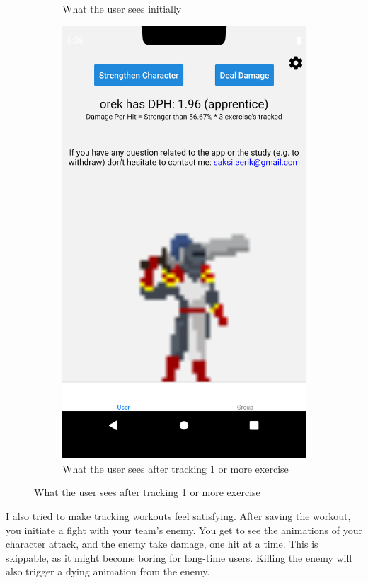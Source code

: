 \documentclass{l4proj}
\begin{document}
\begin{figure}[H]
\begin{subfigure}{0.45\textwidth}
      \caption{What the user sees initially}
    \end{subfigure}
    \begin{subfigure}{0.45\textwidth }
        \includegraphics[width=\textwidth]{apprentice.png}
        \caption{What the user sees after tracking 1 or more exercise} 
    \end{subfigure}
\end{figure}

\newpage
I also tried to make tracking workouts feel satisfying. After saving the workout, you initiate a fight with your team's enemy. You get to see the animations of your character attack, and the enemy take damage, one hit at a time. This is skippable, as it might become boring for long-time users. Killing the enemy will also trigger a dying animation from the enemy.
\end{document}
